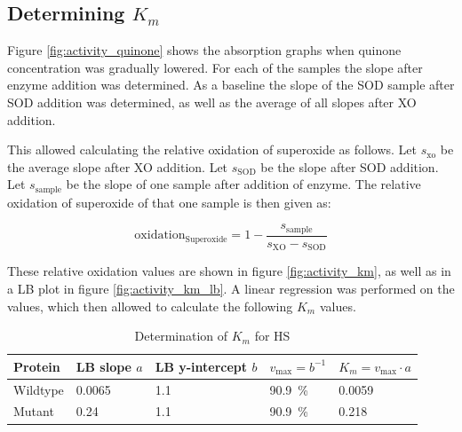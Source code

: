 \subsection{Determining $K_m$}

Figure \ref{fig:activity_quinone} shows the absorption graphs when quinone
concentration was gradually lowered. For each of the samples the slope after
enzyme addition was determined. As a baseline the slope of the SOD sample after
SOD addition was determined, as well as the average of all slopes after XO
addition.

This allowed calculating the relative oxidation of superoxide as follows. Let
$s_{\text{xo}}$ be the average slope after XO addition. Let $s_{\text{SOD}}$ be
the slope after SOD addition. Let $s_{\text{sample}}$ be the slope of one
sample after addition of enzyme. The relative oxidation of superoxide of that
one sample is then given as:

\[
	\text{oxidation}_{\text{Superoxide}} = 1 - \frac{s_{\text{sample}}}{s_{\text{XO}} - s_{\text{SOD}}}
\]

These relative oxidation values are shown in figure \ref{fig:activity_km}, as
well as in a LB plot in figure \ref{fig:activity_km_lb}. A linear regression
was performed on the values, which then allowed to calculate the following
$K_m$ values.

\begin{table}
	\centering
	\begin{tabu}{lllll}
		\toprule
		Protein & LB slope $a$ & LB y-intercept $b$ & $v_{\text{max}} = b^{-1}$ & $K_m = v_{\text{max}} \cdot a$ \\
		\midrule
		Wildtype & 0.0065 & 1.1 & \SI{90.9}{\percent} & \SI{0.0059}{\micro\Molar} \\
		Mutant & 0.24 & 1.1 & \SI{90.9}{\percent} & \SI{0.218}{\micro\Molar} \\
		\bottomrule
	\end{tabu}
	\caption{Determination of $K_m$ for HS}
	\label{tbl:activity_km}
\end{table}


